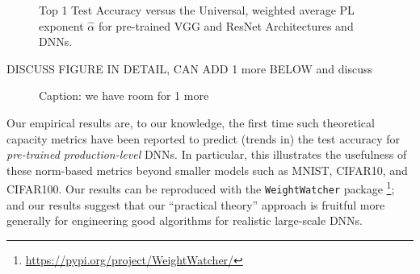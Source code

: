 \begin{figure}[H]
{      \label{fig:resnet_alphahat}
   }
   \caption{
      Top 1 Test Accuracy versus the
      Universal, weighted average PL exponent $\hat{\alpha}$
      for pre-trained VGG and    ResNet Architectures and DNNs.  
           }
   \label{fig:bothmodels}
\end{figure}

DISCUSS FIGURE IN DETAIL, CAN ADD 1 more BELOW and discuss



\begin{figure}[H]
   \centering
   \caption{%
    Caption: we have room for 1 more 
   }
   \label{fig:alphahats}
\end{figure}


Our empirical results are, to our knowledge, the first time such theoretical capacity 
metrics have been reported to predict (trends in) the test accuracy for \emph{pre-trained production-level} DNNs.
In particular, this illustrates the usefulness of these norm-based metrics beyond smaller models such as MNIST, CIFAR10, and CIFAR100. 
Our  results can be reproduced with the \texttt{WeightWatcher} package%
\footnote{\url{https://pypi.org/project/WeightWatcher/}};
and our
results suggest that our ``practical theory'' approach is fruitful more generally for engineering good algorithms for realistic large-scale DNNs.

